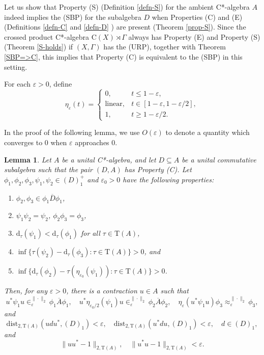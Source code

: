 \documentclass[12pt, oneside, psamsfonts]{amsart}
\newtheorem{lem}[thm]{Lemma}
\theoremstyle{definition}
\theoremstyle{remark}
\numberwithin{equation}{section}
\newcommand{\norm}[1]{\| #1\|}
\newcommand{\eps}{\varepsilon}
\newcommand{\tr}{\mathrm{T}}
\begin{document}
Let us show that Property (S) (Definition \ref{defn-S}) for the ambient C*-algebra $A$ indeed implies the (SBP) for the subalgebra $D$ when Properties (C) and (E) (Definitions \ref{defn-C} and \ref{defn-D} ) are present (Theorem \ref{prop-S}). Since the crossed product C*-algebra $\mathrm{C}(X) \rtimes \Gamma$ always has Property (E) and Property (S) (Theorem \ref{S-holds}) if $(X, \Gamma)$ has the (URP), together with Theorem \ref{SBP=>C}, this implies that Property (C) is equivalent to the (SBP) in this setting.

For each $\eps>0$, define 
\begin{equation}\label{defn-eta}
\eta_\eps(t) = \left\{
\begin{array}{ll}
0, & t \leq 1-\eps, \\
\mathrm{linear}, & t \in [1-\eps, 1-\eps/2], \\
1, & t \geq 1-\eps/2.
\end{array}
\right.
\end{equation}

In the proof of the following lemma, we use $O(\eps)$ to denote a quantity which converges to $0$ when $\eps$ approaches $0$.
\begin{lem}\label{D-sandwich}
Let $A$ be a unital C*-algebra, and let $D \subseteq A$ be a unital commutative subalgebra such that the pair $(D, A)$ has Property (C). Let $\phi_1, \phi_2, \phi_3, \psi_1, \psi_2 \in (D)_1^+$ and $\eps_0>0$ have the following properties:
\begin{enumerate}
\item\label{cond-s-1} $\phi_2, \phi_3 \in \overline{\phi_1 D\phi_1}$,
\item\label{cond-s-2} $\psi_1\psi_2 = \psi_2$, $\phi_2 \phi_3 = \phi_3$,
\item\label{cond-s-3} $\mathrm{d}_\tau(\psi_1) < \mathrm{d}_\tau(\phi_1)$ for all $\tau\in\tr(A)$,
\item\label{cond-s-4} $\inf\{\tau(\psi_2) - \mathrm{d}_\tau(\phi_3): \tau \in \tr(A)\} >0 $, and
\item\label{cond-s-5} $\inf\{\mathrm{d}_\tau(\phi_2) - \tau(\eta_{\eps_0}(\psi_1)): \tau \in \tr(A)\} >0 $.  \end{enumerate}
Then, for any $\eps>0$, there is a contraction $u\in A$ such that
$$ u^*\psi_1u \in_\eps^{\norm{\cdot}_2}  \overline{\phi_1A\phi_1},\quad u^*\eta_{\eps_0/2}(\psi_1)u \in^{\norm{\cdot}_2}_{\eps} \overline{\phi_2A\phi_2}, \quad  \eta_{\eps}(u^*\psi_1u) \phi_3 \approx_{\eps}^{\norm{\cdot}_2} \phi_3,$$
and
$$\mathrm{dist}_{2, \tr(A)}(udu^*, (D)_1) < \eps,\quad \mathrm{dist}_{2, \tr(A)}(u^*du, (D)_1) < \eps,\quad d \in (D)_1,$$
and
$$\norm{uu^* - 1}_{2, \tr(A)}, \quad \norm{u^*u - 1}_{2, \tr(A)} < \eps.$$
\end{lem}
\end{document}

